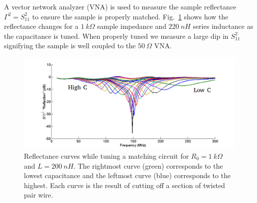 A vector network analyzer (VNA) is used to measure the sample reflectance $\Gamma^2 = S_{11}^2$ to ensure the sample is properly matched. Fig.~\ref{fig:gimmick_tuning} shows how the reflectance changes for a $1~k\Omega$ sample impedance and $220~nH$ series inductance as the capacitance is tuned. When properly tuned we measure a large dip in $S_{11}^2$ signifying the sample is well coupled to the $50~\Omega$ VNA.
\begin{figure}
\centering
\includegraphics[width=\textwidth]{figures/Johnson_noise_thermometry/gimmick_tuning.png}
\caption{Reflectance curves while tuning a matching circuit for $R_0 = 1~k\Omega$ and $L = 200~nH$. The rightmost curve (green) corresponds to the lowest capacitance and the leftmost curve (blue) corresponds to the highest. Each curve is the result of cutting off a section of twisted pair wire.}
\label{fig:gimmick_tuning}
\end{figure} 

